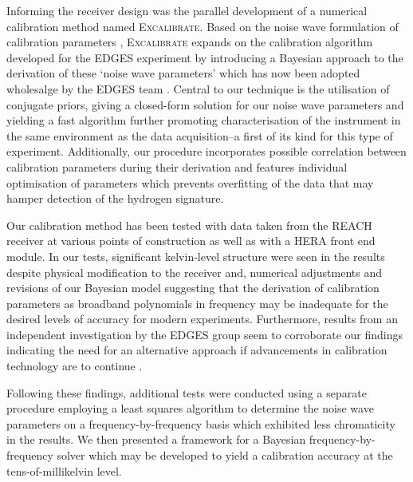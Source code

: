 Informing the receiver design was the parallel development of a numerical calibration method named \textsc{Excalibrate}. Based on the noise wave formulation of calibration parameters \citep{meys}, \textsc{Excalibrate} expands on the calibration algorithm developed for the EDGES experiment \citep{edgesCal} by introducing a Bayesian approach to the derivation of these ‘noise wave parameters’ which has now been adopted wholesalge by the EDGES team \citep{murray_calpap}. Central to our technique is the utilisation of conjugate priors, giving a closed-form solution for our noise wave parameters and yielding a fast algorithm further promoting characterisation of the instrument in the same environment as the data acquisition--a first of its kind for this type of experiment. Additionally, our procedure incorporates possible correlation between calibration parameters during their derivation and features individual optimisation of parameters which prevents overfitting of the data that may hamper detection of the hydrogen signature.

Our calibration method has been tested with data taken from the REACH receiver at various points of construction as well as with a HERA front end module. In our tests, significant kelvin-level structure were seen in the results despite physical modification to the receiver and, numerical adjustments and revisions of our Bayesian model suggesting that the derivation of calibration parameters as broadband polynomials in frequency may be inadequate for the desired levels of accuracy for modern experiments. Furthermore, results from an independent investigation by the EDGES group seem to corroborate our findings indicating the need for an alternative approach if advancements in calibration technology are to continue \citep{murray_calpap}.

Following these findings, additional tests were conducted using a separate procedure employing a least squares algorithm to determine the noise wave parameters on a frequency-by-frequency basis which exhibited less chromaticity in the results. We then presented a framework for a Bayesian frequency-by-frequency solver which may be developed to yield a calibration accuracy at the tens-of-millikelvin level.


